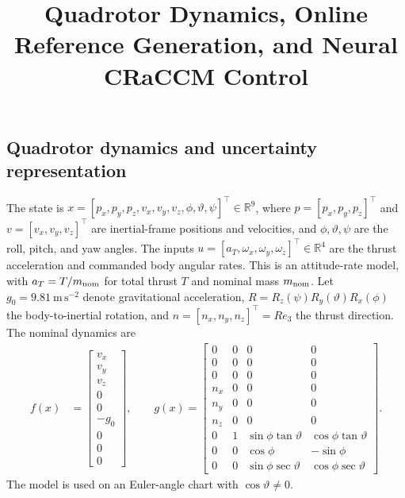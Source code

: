 \documentclass[11pt]{article}
\title{Quadrotor Dynamics, Online Reference Generation, and Neural CRaCCM Control}
\author{}
\date{}
\begin{document}
\maketitle

\subsection{Quadrotor dynamics and uncertainty representation}

The state is
$x=[p_x,p_y,p_z,v_x,v_y,v_z,\phi,\vartheta,\psi]^\top\in\mathbb R^9$,
where $p=[p_x,p_y,p_z]^\top$ and $v=[v_x,v_y,v_z]^\top$ are
inertial-frame positions and velocities, and $\phi,\vartheta,\psi$
are the roll, pitch, and yaw angles. The inputs
$u=[a_T,\omega_x,\omega_y,\omega_z]^\top\in\mathbb R^4$ are the
thrust acceleration and commanded body angular rates.
This is an attitude-rate model, with $a_T=T/m_{\rm nom}$ for total
thrust $T$ and nominal mass $m_{\rm nom}$.
Let $g_0=9.81~\mathrm{m\,s^{-2}}$ denote gravitational acceleration,
$R=R_z(\psi)R_y(\vartheta)R_x(\phi)$ the body-to-inertial rotation,
and $n=[n_x,n_y,n_z]^\top=Re_3$ the thrust direction.
The nominal dynamics are
\begin{align}
    f(x)&=\begin{bmatrix}
        v_x\\v_y\\v_z\\0\\0\\-g_0\\0\\0\\0
    \end{bmatrix},\qquad
    g(x)=\begin{bmatrix}
        0&0&0&0\\
        0&0&0&0\\
        0&0&0&0\\
        n_x&0&0&0\\
        n_y&0&0&0\\
        n_z&0&0&0\\
        0&1&\sin\phi\tan\vartheta&\cos\phi\tan\vartheta\\
        0&0&\cos\phi&-\sin\phi\\
        0&0&\sin\phi\sec\vartheta&\cos\phi\sec\vartheta
    \end{bmatrix}.
\end{align}
The model is used on an Euler-angle chart with $\cos\vartheta\ne0$.
\end{document}
